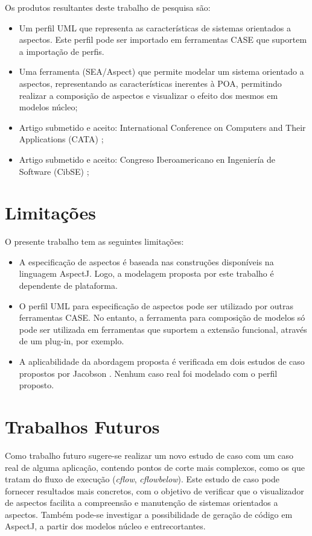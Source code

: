 Os produtos resultantes deste trabalho de pesquisa são:

\begin{itemize}
  \item Um perfil UML que representa as características de sistemas orientados a aspectos. Este perfil pode ser importado em ferramentas CASE
  que suportem a importação de perfis.
  \item Uma ferramenta (SEA/Aspect) que permite modelar um sistema orientado a aspectos, representando as características inerentes à POA,
  permitindo realizar a composição de aspectos e visualizar o efeito dos mesmos em modelos núcleo;
  \item Artigo submetido e aceito: International Conference on Computers and Their Applications (CATA) \cite{ghilardi_cata:13};
  \item Artigo submetido e aceito: Congreso Iberoamericano en Ingeniería de Software (CibSE) \cite{ghilardi_cibse:13};
\end{itemize}

\section{Limitações}

O presente trabalho tem as seguintes limitações:

\begin{itemize}
  \item A especificação de aspectos é baseada nas construções disponíveis na linguagem AspectJ. Logo, a modelagem proposta por este trabalho é
  dependente de plataforma.
  \item O perfil UML para especificação de aspectos pode ser utilizado por outras ferramentas CASE. No entanto, a ferramenta para composição de
  modelos só pode ser utilizada em ferramentas que suportem a extensão funcional, através de um plug-in, por exemplo.
  \item A aplicabilidade da abordagem proposta é verificada em dois estudos de caso propostos por Jacobson \cite{Jacobson:2004:ASD:1062430}. Nenhum
  caso real foi modelado com o perfil proposto.
\end{itemize}

\section{Trabalhos Futuros}

Como trabalho futuro sugere-se realizar um novo estudo de caso com um caso real de alguma aplicação, contendo pontos de corte mais complexos, como os
que tratam do fluxo de execução (\textit{cflow}, \textit{cflowbelow}). Este estudo de caso pode fornecer resultados mais concretos, com
o objetivo de verificar que o visualizador de aspectos facilita a compreensão e manutenção de sistemas orientados a aspectos. Também pode-se
investigar a possibilidade de geração de código em AspectJ, a partir dos modelos núcleo e entrecortantes.

